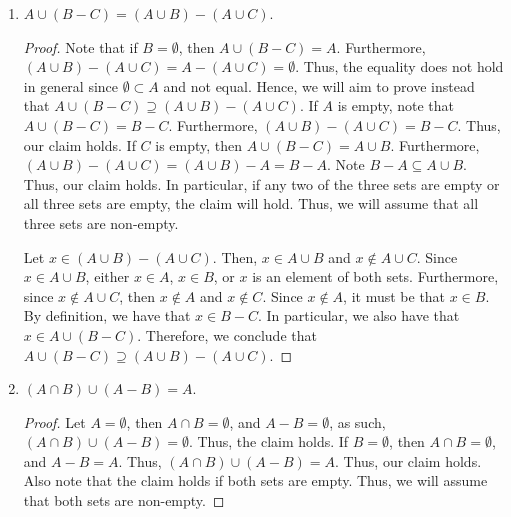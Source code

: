 \documentclass[12pt]{article}
\begin{document}
\begin{enumerate}[label=(\alph*)]
\begin{proof}
		Let $x \in (A \cap B) - (A \cap C)$. Then, $x \in A \cap B$ and $x \notin A \cap C$.
		Since $x \in A \cap B$, $x \in A$ and $x \in B$. Furthermore, since $x \notin A \cap C$
		and $x \in A$, it must be that $x \notin C$. In particular, we have that 
		$x \in B - C$ by definition and $x \in A$. Therefore, $x \in A \cap (B - C)$.
		Hence, $(A \cap B) - (A \cap C) \subseteq A \cap (B - C)$. Thus, we can
		conclude that $A \cap (B - C) = (A \cap B) - (A \cap C)$.
	\end{proof}
	\item $A \cup (B - C) = (A \cup B) - (A \cup C)$.
	\begin{proof}
		Note that if $B = \emptyset$, then $A \cup (B - C) = A$. Furthermore,
		$(A \cup B) - (A \cup C) = A - (A \cup C) = \emptyset$. Thus, the equality does 
		not hold in general since $\emptyset \subset A$ and not equal. Hence, we will
		aim to prove instead that $A \cup (B - C) \supseteq (A \cup B) - (A \cup C)$.
		If $A$ is empty, note that $A \cup (B - C) = B - C$. Furthermore, 
		$(A \cup B) - (A \cup C) = B - C$. Thus, our claim holds. If $C$ is empty,
		then $A \cup (B - C) = A \cup B$. Furthermore, $(A \cup B) - (A \cup C) = 
		(A \cup B) - A = B - A$. Note $B - A \subseteq A \cup B$. Thus, our claim holds.
		In particular, if any two of the three sets are empty or all three sets are empty,
		the claim will hold. Thus, we will assume that all three sets are non-empty.
		
		Let $x \in (A \cup B) - (A \cup C)$. Then, $x \in A \cup B$ and $x \notin A \cup C$.
		Since $x \in A \cup B$, either $x \in A$, $x \in B$, or $x$ is an element of both
		sets. Furthermore, since $x \notin A \cup C$, then $x \notin A$ and $x \notin C$.
		Since $x \notin A$, it must be that $x \in B$. By definition, we have that 
		$x \in B - C$. In particular, we also have that $x \in A \cup (B - C)$.
		Therefore, we conclude that $A \cup (B - C) \supseteq (A \cup B) - (A \cup C)$.
	\end{proof}
	\item $(A \cap B) \cup (A - B) = A$.
	\begin{proof}
		Let $A = \emptyset$, then $A \cap B = \emptyset$, and $A - B = \emptyset$,
		as such, $(A \cap B) \cup (A - B) = \emptyset$. Thus, the claim holds. 
		If $B = \emptyset$, then $A \cap B = \emptyset$, and $A - B = A$. Thus,
		$(A \cap B) \cup (A - B) = A$. Thus, our claim holds. Also note that the claim
		holds if both sets are empty. Thus, we will assume that both sets are non-empty.
		

\end{proof}
\end{enumerate}
\end{document}
